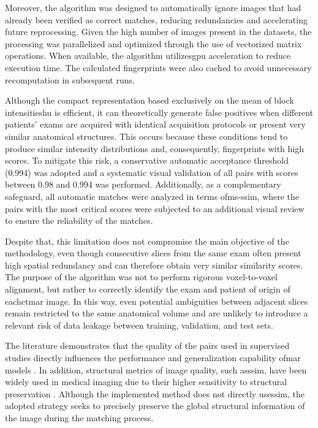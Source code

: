 Moreover, the algorithm was designed to automatically ignore images that had already been verified as correct matches, reducing redundancies and accelerating future reprocessing. Given the high number of images present in the datasets, the processing was parallelized and optimized through the use of vectorized matrix operations. When available, the algorithm utilizes\acrshort{gpu} acceleration to reduce execution time. The calculated fingerprints were also cached to avoid unnecessary recomputation in subsequent runs.

Although the compact representation based exclusively on the mean of block intensities\acrshort{hu} is efficient, it can theoretically generate false positives when different patients' exams are acquired with identical acquisition protocols or present very similar anatomical structures. This occurs because these conditions tend to produce similar intensity distributions and, consequently, fingerprints with high scores. To mitigate this risk, a conservative automatic acceptance threshold (0.994) was adopted and a systematic visual validation of all pairs with scores between 0.98 and 0.994 was performed. Additionally, as a complementary safeguard, all automatic matches were analyzed in terms of\acrshort{ms-ssim}, where the pairs with the most critical scores were subjected to an additional visual review to ensure the reliability of the matches.


Despite that, this limitation does not compromise the main objective of the methodology, even though consecutive slices from the same exam often present high spatial redundancy and can therefore obtain very similar similarity scores. The purpose of the algorithm was not to perform rigorous voxel-to-voxel alignment, but rather to correctly identify the exam and patient of origin of each\acrshort{ctmar} image. In this way, even potential ambiguities between adjacent slices remain restricted to the same anatomical volume and are unlikely to introduce a relevant risk of data leakage between training, validation, and test sets. 

The literature demonstrates that the quality of the pairs used in supervised studies directly influences the performance and generalization capability of\acrshort{mar} models \cite{linDuDoNetDualDomain2019, kleberAdvancementsSupervisedDeep2024}. In addition, structural metrics of image quality, such as\acrshort{ssim}, have been widely used in medical imaging due to their higher sensitivity to structural preservation \cite{zhouwangImageQualityAssessment2004}. Although the implemented method does not directly use\acrshort{ssim}, the adopted strategy seeks to precisely preserve the global structural information of the image during the matching process.

